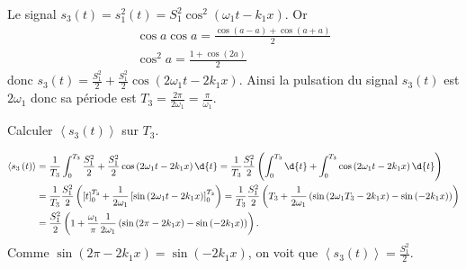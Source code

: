 
\begin{corrige}
	Le signal $s_3(t) = s_1^2(t) = S^2_1 \cos^2\left( \omega_1 t - k_1 x \right)$. Or
	\begin{align*}
		\cos a \cos a = \frac{\cos\left( a-a \right)+\cos\left( a+a \right) }{2}\\
		\cos^2 a = \frac{1+\cos\left( 2a \right) }{2}
	\end{align*}
	donc $s_3(t) = \frac{S^2_1}{2} + \frac{S^2_1}{2} \cos \left( 2\omega_1 t - 2k_1 x \right)  $.
	Ainsi la pulsation du signal $s_3(t)$ est $2\omega_1$ donc sa période est $T_3 = \frac{2\pi}{2\omega_1} = \frac{\pi}{\omega_1}$.
\end{corrige}




\begin{enonce}
	Calculer $\left< s_3\left( t \right) \right>$ sur $T_3$.
\end{enonce}
		
			
\begin{corrige}
	\begin{align*}
	\left< s_3\left( t \right) \right> &= \frac{1}{T_3} \int_0^{T_3} \frac{S^2_1}{2} + \frac{S^2_1}{2} \cos \left( 2\omega_1 t - 2k_1 x \right) \d{t}
	= \frac{1}{T_3} \frac{S^2_1}{2} \left( \int_0^{T_3} \d{t} + \int_0^{T_3} \cos \left( 2\omega_1 t - 2k_1 x \right) \d{t} \right)\\
	&= \frac{1}{T_3}\frac{S^2_1}{2} \left( \left[t\right]^{T_3}_0 + \frac{1}{2\omega_1}\left[ \sin\left( 2\omega_1 t - 2k_1 x \right) \right]^{T_3}_0 \right)
	= \frac{1}{T_3}\frac{S^2_1}{2} \left( T_3 + \frac{1}{2\omega_1} \left( \sin\left( 2\omega_1 T_3 - 2k_1 x \right) - \sin\left( - 2k_1 x \right) \right) \right)\\
	&= \frac{S^2_1}{2} \left(  1 +  \frac{\omega_1}{\pi}\frac{1}{2\omega_1} \left( \sin\left( 2\pi - 2k_1 x \right) - \sin\left( - 2k_1 x \right) \right) \right).
	\end{align*}
	Comme $ \sin\left( 2\pi -2k_1 x \right) =  \sin\left( -2k_1 x \right)$, on voit que $\left< s_3\left( t \right) \right>=\frac{S^2_1}{2}$.
\end{corrige}



